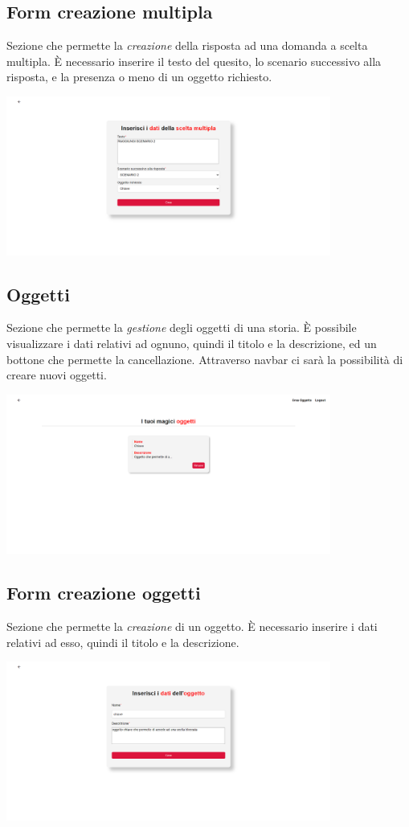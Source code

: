\documentclass{article}
\begin{document}
\subsection*{Form creazione multipla}
Sezione che permette la \textit{creazione} della risposta ad una domanda a scelta multipla. È necessario inserire il testo del quesito, lo scenario successivo alla risposta, e la presenza o meno di un oggetto richiesto.
\begin{center}
    \includegraphics[width=0.8\textwidth]{foto18.png}
\end{center}


\subsection*{Oggetti}
Sezione che permette la \textit{gestione} degli oggetti di una storia. È possibile visualizzare i dati relativi ad ognuno, quindi il titolo e la descrizione, ed un bottone che permette la cancellazione. Attraverso navbar ci sarà la possibilità di creare nuovi oggetti.
\begin{center}
    \includegraphics[width=0.8\textwidth]{foto19.png}
\end{center}


\subsection*{Form creazione oggetti}
Sezione che permette la \textit{creazione} di un oggetto. È necessario inserire i dati relativi ad esso, quindi il titolo e la descrizione.
\begin{center}
    \includegraphics[width=0.8\textwidth]{foto20.png}
\end{center}
\end{document}
